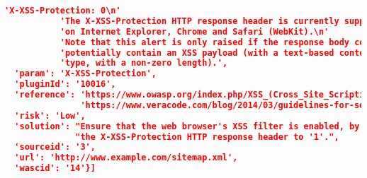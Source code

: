 \begin{lstlisting}[language=json,label={lst:owas_zap_welcome_message_alerts},caption={Alerts showed with NGINX default configuration}]
           'X-XSS-Protection: 0\n'
           'The X-XSS-Protection HTTP response header is currently supported '
           'on Internet Explorer, Chrome and Safari (WebKit).\n'
           'Note that this alert is only raised if the response body could '
           'potentially contain an XSS payload (with a text-based content '
           'type, with a non-zero length).',
  'param': 'X-XSS-Protection',
  'pluginId': '10016',
  'reference': 'https://www.owasp.org/index.php/XSS_(Cross_Site_Scripting)_Prevention_Cheat_Sheet\n'
               'https://www.veracode.com/blog/2014/03/guidelines-for-setting-security-headers/',
  'risk': 'Low',
  'solution': "Ensure that the web browser's XSS filter is enabled, by setting "
              "the X-XSS-Protection HTTP response header to '1'.",
  'sourceid': '3',
  'url': 'http://www.example.com/sitemap.xml',
  'wascid': '14'}]
\end{lstlisting}